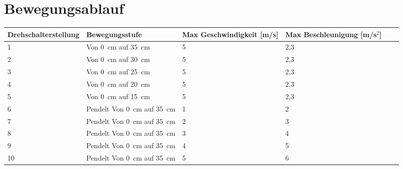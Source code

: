 \documentclass[12pt,a4paper]{scrbook}
\begin{document}
		\section{Bewegungsablauf}
	
\fontsize{8}{10}\selectfont
\begin{tabularx}{\textwidth}{|p{3cm}|X|X|X|p{1cm}|X|}
	\hline 
	\textbf{Drehschalterstellung}  & \textbf{Bewegungsstufe} & \textbf{Max Geschwindigkeit [m/s]} &  \textbf{Max Beschleunigung [m/s$^{2}$]} \\ \hline
	1 & Von 0\ cm auf 35\ cm & 5 & 2,3   \\
	\hline
	2 & Von 0\ cm auf 30\ cm & 5 & 2,3 \\
	\hline
	3 & Von 0\ cm auf 25\ cm & 5 & 2,3 \\
	\hline
	4 & Von 0\ cm auf 20\ cm & 5 & 2,3 \\
	\hline
	5 & Von 0\ cm auf 15\ cm & 5 & 2,3 \\
	\hline
	6 & Pendelt Von 0\ cm auf 35\ cm & 1 & 2 \\
	\hline
	7 &Pendelt Von 0\ cm auf 35\ cm & 2 & 3 \\
	\hline
	8 & Pendelt Von 0\ cm auf 35\ cm & 3 & 4 \\
	\hline
	9 & Pendelt Von 0\ cm auf 35\ cm & 4 & 5 \\
	\hline
	10 & Pendelt Von 0\ cm auf 35\ cm & 5 & 6 \\
	\hline	
\end{tabularx}
		
\end{document}
